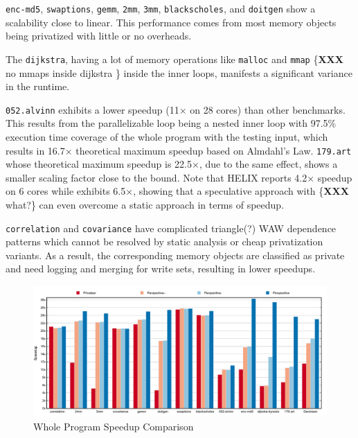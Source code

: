 \texttt{enc-md5}, \texttt{swaptions}, \texttt{gemm}, \texttt{2mm},
\texttt{3mm}, \texttt{blackscholes}, and \texttt{doitgen} show a
scalability close to linear. This performance comes from most memory
objects being privatized with little or no overheads.

The \texttt{dijkstra}, having a lot of memory operations like
\texttt{malloc} and \texttt{mmap} \{\textbf{XXX} no mmaps inside dijkstra \}
inside the inner loops, manifests a
significant variance in the runtime.

\texttt{052.alvinn} exhibits a lower speedup (11$\times$ on 28
cores) than other benchmarks. This results from the parallelizable loop
being a nested inner loop with 97.5\% execution time coverage of the whole
program with the testing input, which results in 16.7$\times$
theoretical maximum speedup based on Almdahl's Law.
\texttt{179.art} whose theoretical maximum speedup is 22.5$\times$, due to
the same effect, shows a smaller scaling factor close to the bound. Note
that HELIX\cite{simone:12:cgo} reports 4.2$\times$ speedup on 6 cores while
\name exhibits 6.5$\times$, showing that a speculative approach with
\{\textbf{XXX} what?\} can even overcome a static approach in terms of speedup.

\texttt{correlation} and \texttt{covariance} have complicated triangle(?) WAW
dependence patterns which cannot be resolved by static analysis or cheap
privatization variants. As a result, the corresponding memory objects are
classified as private and need logging and merging for write sets,
resulting in lower speedups.

\begin{figure}[ht]
  \includegraphics[width=\textwidth]{figures/compare-privateer}
  \caption{Whole Program Speedup Comparison}
  \label{fig:speedup-compare}
\end{figure}

